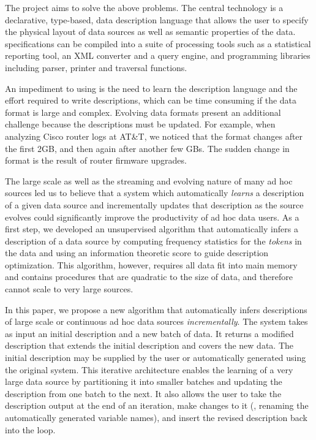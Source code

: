 The \pads{} project \cite{padsweb} aims to solve the above 
problems. The central technology is a declarative, type-based, 
data description language that allows the user to specify the physical
layout of data sources as well as semantic properties of the data. 
\pads{} specifications can be compiled into a suite of
processing tools such as a statistical reporting tool, an 
XML converter and a query engine, and programming libraries 
including parser, printer and traversal functions. 

An impediment to using \pads{} is the need to learn
the description language and the effort required to
write \pads{} descriptions, which can be time consuming
if the data format is large and complex. Evolving data formats 
present an additional challenge because the descriptions must be updated.
For example, when analyzing Cisco router
logs at AT\&T, we noticed that the format changes after the first 2GB, 
and then again after another few GBs. The sudden change in format is
the result of router firmware upgrades.

The large scale as well as the streaming and evolving nature of many ad hoc
sources led us to believe that a system which automatically {\em learns}
a \pads{} description of a given data source and incrementally updates that
description as the source evolves could significantly improve the productivity of ad hoc data users.
As a first step, we developed an unsupervised algorithm \learnpads{}
\cite{Fisher+:dirttoshovels,fisher+:sigmod08}
that automatically infers a \pads{} description of a data source by 
computing frequency statistics for the {\em tokens} in the data and using an information
theoretic score to guide description optimization. This algorithm, however,
requires all data fit into main memory and contains procedures 
that are quadratic to the size of data, 
and therefore cannot scale to very large sources. 

In this paper, we propose a new algorithm that automatically infers 
descriptions of large scale or continuous ad hoc data sources 
{\em incrementally}. The system takes as input an initial description 
and a new batch of data. It returns a
modified description that extends the initial description and covers the new 
data. The initial description may be supplied by the user or automatically
generated using the original \learnpads{} system. This iterative architecture
enables the learning of a very large data source by partitioning it 
into smaller batches and updating the description from one batch to the next. 
It also allows the user to take the description output at the end of
an iteration, make changes to it (\eg{}, renaming the 
automatically generated variable names), and insert the revised description back into the loop.

